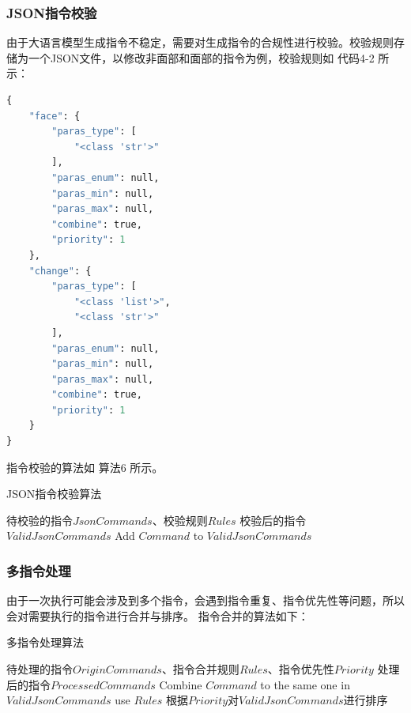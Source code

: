 \documentclass[a4paper,AutoFakeBold,oneside,12pt]{book}
\begin{document}
\subsubsection{JSON指令校验}
由于大语言模型生成指令不稳定，需要对生成指令的合规性进行校验。校验规则存储为一个JSON文件，以修改非面部和面部的指令为例，校验规则如 代码4-2 所示：
\begin{lstlisting}[language=Python, caption=指令校验规则, label=plus, tabsize=2]  
    {
    "face": {
        "paras_type": [
            "<class 'str'>"
        ],
        "paras_enum": null,
        "paras_min": null,
        "paras_max": null,
        "combine": true,
        "priority": 1
    },
    "change": {
        "paras_type": [
            "<class 'list'>",
            "<class 'str'>"
        ],
        "paras_enum": null,
        "paras_min": null,
        "paras_max": null,
        "combine": true,
        "priority": 1
    }
}
\end{lstlisting} 
指令校验的算法如 算法6 所示。
\begin{algorithm} 
	\begin{spacing}{1.3}
		\caption{JSON指令校验算法} 
		\label{JsonCommandCheckAlgorithm}
		\renewcommand{\algorithmicrequire}{\textbf{输入：}}
		\renewcommand{\algorithmicensure}{\textbf{输出：}} 
			\begin{algorithmic}[1] 
				\Require 待校验的指令$JsonCommands$、校验规则$Rules$
				\Ensure 校验后的指令$ValidJsonCommands$
                        \State Add $Command$ to $ValidJsonCommands$
                    \EndIf
                \EndFor
			\end{algorithmic}
	\end{spacing}
\end{algorithm}

\subsubsection{多指令处理}
由于一次执行可能会涉及到多个指令，会遇到指令重复、指令优先性等问题，所以会对需要执行的指令进行合并与排序。
指令合并的算法如下：
\begin{algorithm} 
	\begin{spacing}{1.3}
		\caption{多指令处理算法} 
		\label{JsonCommandsProcessingAlgorithm}
		\renewcommand{\algorithmicrequire}{\textbf{输入：}}
		\renewcommand{\algorithmicensure}{\textbf{输出：}} 
			\begin{algorithmic}[1] 
				\Require 待处理的指令$OriginCommands$、指令合并规则$Rules$、指令优先性$Priority$
				\Ensure 处理后的指令$ProcessedCommands$
                        \State Combine $Command$ to the same one in $ValidJsonCommands$ use $Rules$
                    \EndIf
                \EndFor
                \State 根据$Priority$对$ValidJsonCommands$进行排序
			\end{algorithmic}
	\end{spacing}
\end{algorithm}
\end{document}
